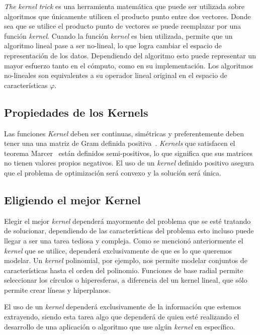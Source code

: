\textit{The} \textit{kernel} \textit{trick} es una herramienta matemática que puede ser utilizada sobre algoritmos que únicamente utilicen el producto punto entre dos vectores. Donde sea que se utilice el producto punto de vectores se puede reemplazar por una función \textit{kernel}. Cuando la función \textit{kernel} es bien utilizada, permite que un algoritmo lineal pase a ser no-lineal, lo que logra cambiar el espacio de representación de los datos. Dependiendo del algoritmo esto puede representar un mayor esfuerzo tanto en el cómputo, como en su implementación. Los algoritmos no-lineales son equivalentes a su operador lineal original en el espacio de características $\varphi$.

\subsection{Propiedades de los Kernels}

Las funciones \textit{Kernel} deben ser continuas, simétricas y preferentemente deben tener una una matriz de Gram definida positiva~\cite{Gram}. \textit{Kernels} que satisfacen el teorema Marcer~\cite{minh2006mercer} están definidos semi-positivos, lo que significa que sus matrices no tienen valores propios negativos. El uso de un \textit{kernel} definido positivo asegura que el problema de optimización será convexo y la solución será única.

\subsection{Eligiendo el mejor Kernel}

Elegir el mejor \textit{kernel} dependerá mayormente del problema que se esté tratando de solucionar, dependiendo de las características del problema esto incluso puede llegar a ser una tarea tediosa y compleja. Como se mencionó anteriormente el \textit{kernel} que se utilice, dependerá exclusivamente de que es lo que queremos modelar. Un \textit{kernel} polinomial, por ejemplo, nos permite modelar conjuntos de características hasta el orden del polinomio. Funciones de base radial permite seleccionar los círculos o hiperesferas, a diferencia del un kernel lineal, que sólo permite crear líneas y hiperplanos.

El uso de un \textit{kernel} dependerá exclusivamente de la información que estemos extrayendo, siendo esta tarea algo que dependerá de quien esté realizando el desarrollo de una aplicación o algoritmo que use algún \textit{kernel} en específico.

